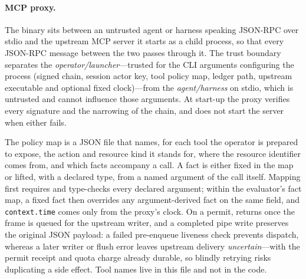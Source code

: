 \documentclass[10pt,twocolumn]{article}
\theoremstyle{plain}
\theoremstyle{definition}
\begin{document}
\paragraph{MCP proxy.}
The  binary sits between an untrusted agent or harness speaking JSON-RPC over stdio and the upstream MCP server it starts as a child process, so that every JSON-RPC message between the two passes through it. The trust boundary separates the \emph{operator/launcher}---trusted for the CLI arguments configuring the process (signed chain, session actor key, tool policy map, ledger path, upstream executable and optional fixed clock)---from the \emph{agent/harness} on stdio, which is untrusted and cannot influence those arguments. At start-up the proxy verifies every signature and the narrowing of the chain, and does not start the server when either fails.

The policy map is a JSON file that names, for each tool the operator is prepared to expose, the action and resource kind it stands for, where the resource identifier comes from, and which facts accompany a call. A fact is either fixed in the map or lifted, with a declared type, from a named argument of the call itself. Mapping first requires and type-checks every declared argument; within the evaluator's fact map, a fixed fact then overrides any argument-derived fact on the same field, and \texttt{context.time} comes only from the proxy's clock. On a permit,  returns once the frame is queued for the upstream writer, and a completed pipe write preserves the original JSON payload: a failed pre-enqueue liveness check prevents dispatch, whereas a later writer or flush error leaves upstream delivery \emph{uncertain}---with the permit receipt and quota charge already durable, so blindly retrying risks duplicating a side effect. Tool names live in this file and not in the code.
\end{document}
